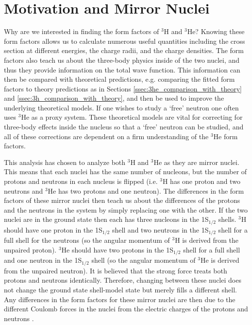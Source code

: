 \section{Motivation and Mirror Nuclei}
\label{sec:mirror_nuclei}

Why are we interested in finding the form factors of $^3$H and $^3$He? Knowing these form factors allows us to calculate numerous useful quantities including the cross section at different energies, the charge radii, and the charge densities. The form factors also teach us about the three-body physics inside of the two nuclei, and thus they provide information on the total wave function. This information can then be compared with theoretical predictions, e.g. comparing the fitted form factors to theory predictions as in Sections \ref{ssec:3he_comparison_with_theory} and \ref{ssec:3h_comparison_with_theory}, and then be used to improve the underlying theoretical models. If one wishes to study a `free' neutron one often uses $^3$He as a proxy system. These theoretical models are vital for correcting for three-body effects inside the nucleus so that a `free' neutron can be studied, and all of these corrections are dependent on a firm understanding of the $^3$He form factors.

This analysis has chosen to analyze both $^3$H and $^3$He as they are mirror nuclei. This means that each nuclei has the same number of nucleons, but the number of protons and neutrons in each nucleus is flipped (i.e. $^3$H has one proton and two neutrons and $^3$He has two protons and one neutron). The differences in the form factors of these mirror nuclei then teach us about the differences of the protons and the neutrons in the system by simply replacing one with the other. If the two nuclei are in the ground state then each has three nucleons in the 1S$_{1/2}$ shells. $^3$H should have one proton in the 1S$_{1/2}$ shell and two neutrons in the 1S$_{1/2}$ shell for a full shell for the neutrons (so the angular momentum of $^3$H is derived from the unpaired proton). $^3$He should have two protons in the 1S$_{1/2}$ shell for a full shell and one neutron in the 1S$_{1/2}$ shell (so the angular momentum of $^3$He is derived from the unpaired neutron). It is believed that the strong force treats both protons and neutrons identically. Therefore, changing between these nuclei does not change the ground state shell-model state but merely fills a different shell. Any differences in the form factors for these mirror nuclei are then due to the different Coulomb forces in the nuclei from the electric charges of the protons and neutrons \cite{Book:Krane}. 

